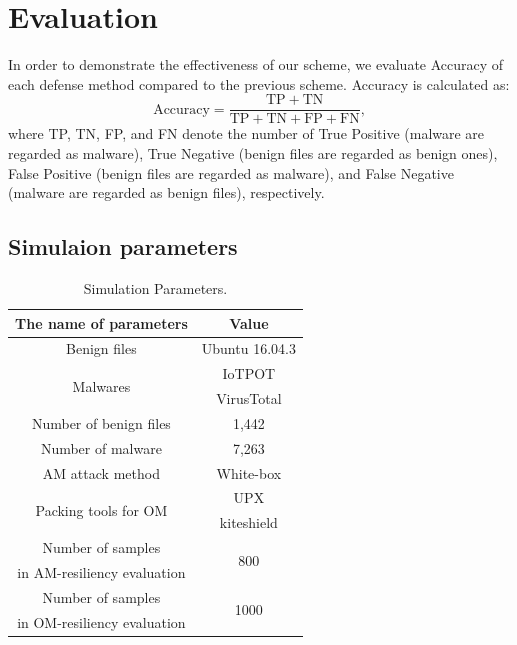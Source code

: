 \documentclass{ieeeaccess}
\begin{document}
\section{Evaluation} \label{sec:evaluation}
In order to demonstrate the effectiveness of our scheme, we evaluate Accuracy of each defense method compared to the previous scheme.
Accuracy is calculated as:
\begin{equation}
  \mathrm{Accuracy} = \frac{\mathrm{TP}+\mathrm{TN}}{\mathrm{TP} + \mathrm{TN} + \mathrm{FP} + \mathrm{FN}}, 
\end{equation}
where TP, TN, FP, and FN denote the number of True Positive (malware are regarded as malware), True Negative (benign files are regarded as benign ones), False Positive (benign files are regarded as malware), and False Negative (malware are regarded as benign files), respectively.  

\subsection{Simulaion parameters}
\begin{table}[h]
	\begin{center}
		\caption{Simulation Parameters.}
		\label{tab:simulation_parameters} 
		\begin{tabular}{|c|c|} \hline
			The name of parameters & Value\\ \hline \hline
			Benign files & Ubuntu 16.04.3\cite{ubuntu}\\ \hline
			\multirow{2}{*}{\hfill Malwares  \hfill} & IoTPOT\cite{iotpot} \\ 
																							 & VirusTotal\cite{virustotal}\\ \hline
			Number of benign files  & 1,442 \\  \hline
			Number of malware  &  7,263 \\ \hline
			AM attack method & White-box \cite{am, yamafumi} \\ \hline
			\multirow{2}{*}{\hfill Packing tools for OM  \hfill} & UPX\cite{upx} \\ & kiteshield\cite{kiteshield} \\ \hline
			Number of samples  & \multirow{2}{*}{\hfill 800 \hfill} \\  
			in AM-resiliency evaluation & \\ \hline 
			Number of samples  & \multirow{2}{*}{\hfill 1000 \hfill} \\  
			in OM-resiliency evaluation & \\ \hline 
		\end{tabular}
	\end{center}
\end{table} 
\end{document}
